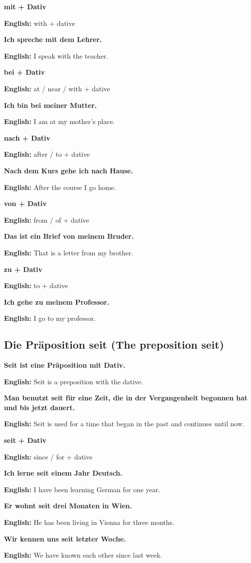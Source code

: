 \documentclass[a4paper,11pt]{article}
\newcommand{\EnglishText}[1]{{\small\color{SoftGray}\textbf{English: }#1\par}}
\newcommand{\EN}[1]{\EnglishText{#1}}
\begin{document}
            \textbf{mit + Dativ}
            \EN{with + dative}
            
            \textbf{Ich spreche mit dem Lehrer.}
            \EN{I speak with the teacher.}
            
            \textbf{bei + Dativ}
            \EN{at / near / with + dative}
            
            \textbf{Ich bin bei meiner Mutter.}
            \EN{I am at my mother's place.}
            
            \textbf{nach + Dativ}
            \EN{after / to + dative}
            
            \textbf{Nach dem Kurs gehe ich nach Hause.}
            \EN{After the course I go home.}
            
            \textbf{von + Dativ}
            \EN{from / of + dative}
            
            \textbf{Das ist ein Brief von meinem Bruder.}
            \EN{That is a letter from my brother.}
            
            \textbf{zu + Dativ}
            \EN{to + dative}
            
            \textbf{Ich gehe zu meinem Professor.}
            \EN{I go to my professor.}
        
        \subsection{Die Präposition seit \textnormal{(The preposition seit)}}
            
            \textbf{Seit ist eine Präposition mit Dativ.}
            \EN{Seit is a preposition with the dative.}
            
            \textbf{Man benutzt seit für eine Zeit, die in der Vergangenheit begonnen hat und bis jetzt dauert.}
            \EN{Seit is used for a time that began in the past and continues until now.}
            
            \textbf{seit + Dativ}
            \EN{since / for + dative}
            
            \textbf{Ich lerne seit einem Jahr Deutsch.}
            \EN{I have been learning German for one year.}
            
            \textbf{Er wohnt seit drei Monaten in Wien.}
            \EN{He has been living in Vienna for three months.}
            
            \textbf{Wir kennen uns seit letzter Woche.}
            \EN{We have known each other since last week.}
            
\end{document}
